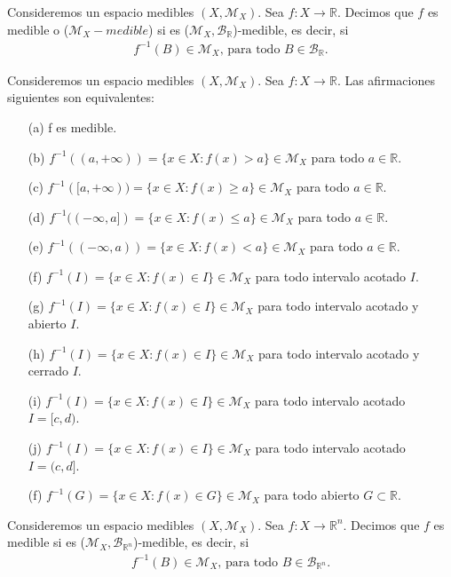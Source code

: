 \begin{defi}
    Consideremos un espacio medibles $(X, \mathcal{M}_X)$. Sea $f : X \longrightarrow \mathbb{R}$. Decimos que $f$ es medible o ($\mathcal{M}_X - medible$) si es ($\mathcal{M}_X, \mathcal{B}_{\mathbb{R}}$)-medible, es decir, si
    \begin{align*}
        f^{-1}(B) \in \mathcal{M}_X \text{, para todo } B \in \mathcal{B}_{\mathbb{R}}.
    \end{align*}
\end{defi}
\begin{prop}
    Consideremos un espacio medibles $(X, \mathcal{M}_X)$. Sea $f : X \longrightarrow \mathbb{R}$. Las afirmaciones siguientes son equivalentes:
    \begin{enumerate}
        \item[(a)] f es medible.
        \item[(b)] $f^{-1}((a, +\infty)) = \{ x \in X : f(x) > a\} \in \mathcal{M}_X$ para todo $a \in \mathbb{R}$.
        \item[(c)] $f^{-1}([a, +\infty)) = \{ x \in X : f(x) \ge a\} \in \mathcal{M}_X$ para todo $a \in \mathbb{R}$.
        \item[(d)] $f^{-1}((-\infty,a]) = \{ x \in X : f(x) \leq a\} \in \mathcal{M}_X$ para todo $a \in \mathbb{R}$.
        \item[(e)] $f^{-1}((-\infty,a)) = \{ x \in X : f(x) < a\} \in \mathcal{M}_X$ para todo $a \in \mathbb{R}$.
        \item[(f)] $f^{-1}(I) = \{ x \in X : f(x) \in I \} \in \mathcal{M}_X$ para todo intervalo acotado $I$.
        \item[(g)] $f^{-1}(I) = \{ x \in X : f(x) \in I \} \in \mathcal{M}_X$ para todo intervalo acotado y abierto $I$.
        \item[(h)] $f^{-1}(I) = \{ x \in X : f(x) \in I \} \in \mathcal{M}_X$ para todo intervalo acotado y cerrado $I$.
        \item[(i)] $f^{-1}(I) = \{ x \in X : f(x) \in I \} \in \mathcal{M}_X$ para todo intervalo acotado $I = [c,d)$.
        \item[(j)] $f^{-1}(I) = \{ x \in X : f(x) \in I \} \in \mathcal{M}_X$ para todo intervalo acotado $I = (c,d]$.
        \item[(f)] $f^{-1}(G) = \{ x \in X : f(x) \in G \} \in \mathcal{M}_X$ para todo abierto $G \subset \mathbb{R}$.
    \end{enumerate}
\end{prop}

\begin{defi}
    Consideremos un espacio medibles $(X, \mathcal{M}_X)$. Sea $f : X \longrightarrow \mathbb{R}^n$. Decimos que $f$ es medible si es ($\mathcal{M}_X, \mathcal{B}_{\mathbb{R}^n}$)-medible, es decir, si
    \begin{align*}
        f^{-1}(B) \in \mathcal{M}_X \text{, para todo } B \in \mathcal{B}_{\mathbb{R}^n}.
    \end{align*}
\end{defi}

